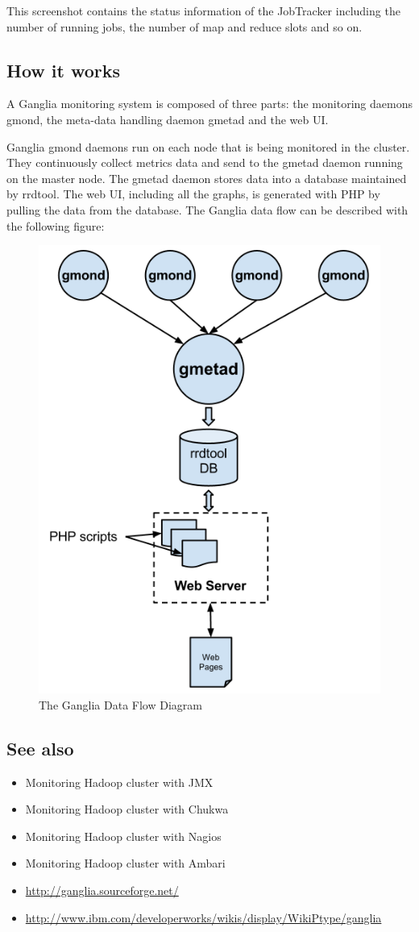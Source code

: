 This screenshot contains the status information of the JobTracker including the number of running jobs, the number of map and reduce slots and so on.

\subsection*{How it works}
A Ganglia monitoring system is composed of three parts: the monitoring daemons gmond, the meta-data handling daemon gmetad and the web UI.

Ganglia gmond daemons run on each node that is being monitored in the cluster. They continuously collect metrics data and send to the gmetad daemon running on the master node. The gmetad daemon stores data into a database maintained by rrdtool. The web UI, including all the graphs, is generated with PHP by pulling the data from the database. The Ganglia data flow can be described with the following figure:
\begin{figure}[h]
  \centering
  \includegraphics[width=.6\textwidth]{figs/5163os_06_13.png}
  \caption{The Ganglia Data Flow Diagram}\label{fig:ganglia.dataflow}
\end{figure} 

\subsection*{See also}
\begin{itemize}
  \item Monitoring Hadoop cluster with JMX
  \item Monitoring Hadoop cluster with Chukwa
  \item Monitoring Hadoop cluster with Nagios
  \item Monitoring Hadoop cluster with Ambari
  \item \url{http://ganglia.sourceforge.net/}
  \item \url{http://www.ibm.com/developerworks/wikis/display/WikiPtype/ganglia}
\end{itemize}
